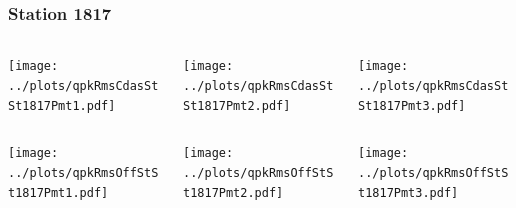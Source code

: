 \documentclass[aspectratio=169]{beamer}
\begin{document}
\begin{frame} 
  \frametitle{Station 1817}
  \begin{center}
    \begin{columns}
      \begin{column}{0.33\textwidth}
        \texttt{[image: ../plots/qpkRmsCdasStSt1817Pmt1.pdf]}
      \end{column}
      \begin{column}{0.33\textwidth}
        \texttt{[image: ../plots/qpkRmsCdasStSt1817Pmt2.pdf]}
      \end{column}
      \begin{column}{0.33\textwidth}
        \texttt{[image: ../plots/qpkRmsCdasStSt1817Pmt3.pdf]}
      \end{column}
    \end{columns}
  \end{center}

  \begin{center}
    \begin{columns}
      \begin{column}{0.33\textwidth}
        \texttt{[image: ../plots/qpkRmsOffStSt1817Pmt1.pdf]}
      \end{column}
      \begin{column}{0.33\textwidth}
        \texttt{[image: ../plots/qpkRmsOffStSt1817Pmt2.pdf]}
      \end{column}
      \begin{column}{0.33\textwidth}
        \texttt{[image: ../plots/qpkRmsOffStSt1817Pmt3.pdf]}
      \end{column}
    \end{columns}
  \end{center}
\end{frame}
\end{document}
